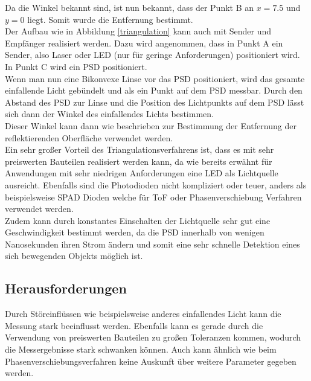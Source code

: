 Da die Winkel bekannt sind, ist nun bekannt, dass der Punkt B an $x = 7.5$ und $y = 0$ liegt. Somit wurde die Entfernung bestimmt.\\
Der Aufbau wie in Abbildung \ref{triangulation} kann auch mit Sender und Empfänger realisiert werden. Dazu wird angenommen, dass in Punkt A ein Sender, also Laser oder \ac{LED} (nur für geringe Anforderungen) positioniert wird. In Punkt C wird ein \ac{PSD} positioniert.\\
Wenn man nun eine Bikonvexe Linse vor das \ac{PSD} positioniert, wird das gesamte einfallende Licht gebündelt und als ein Punkt auf dem \ac{PSD} messbar.
Durch den Abstand des \ac{PSD} zur Linse und die Position des Lichtpunkts auf dem \ac{PSD} lässt sich dann der Winkel des einfallendes Lichts bestimmen.\\
Dieser Winkel kann dann wie beschrieben zur Bestimmung der Entfernung der reflektierenden Oberfläche verwendet werden. \\
Ein sehr großer Vorteil des Triangulationsverfahrens ist, dass es mit sehr preiswerten Bauteilen realisiert werden kann, da wie bereits erwähnt für Anwendungen mit sehr niedrigen Anforderungen eine \ac{LED} als Lichtquelle ausreicht. Ebenfalls sind die Photodioden nicht kompliziert oder teuer, anders als beispielsweise \ac{SPAD} Dioden welche für \ac{ToF} oder Phasenverschiebung Verfahren verwendet werden.\\
Zudem kann durch konstantes Einschalten der Lichtquelle sehr gut eine Geschwindigkeit bestimmt werden, da die \ac{PSD} innerhalb von wenigen Nanosekunden ihren Strom ändern und somit eine sehr schnelle Detektion eines sich bewegenden Objekts möglich ist. \cite{triangulation}\cite{psd}
\subsection{Herausforderungen}
Durch Störeinflüssen wie beispielsweise anderes einfallendes Licht kann die Messung stark beeinflusst werden. Ebenfalls kann es gerade durch die Verwendung von preiswerten Bauteilen zu großen Toleranzen kommen, wodurch die Messergebnisse stark schwanken können. Auch kann ähnlich wie beim Phasenverschiebungsverfahren keine Auskunft über weitere Parameter gegeben werden. 